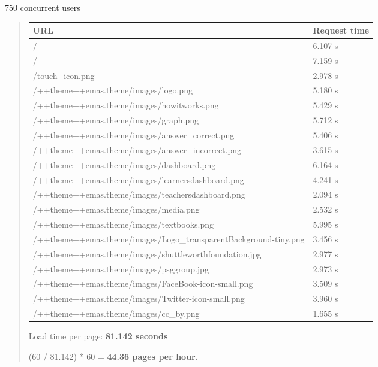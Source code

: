 \documentclass[letterpaper,10pt,english]{sphinxmanual}
\begin{document}
750 concurrent users
\begin{quote}

\begin{tabulary}{\linewidth}{|L|L|}
\hline
\textbf{\relax 
URL
} & \textbf{\relax 
Request time
}\\\hline

/
 & 
6.107 s
\\\hline

/
 & 
7.159 s
\\\hline

/touch\_icon.png
 & 
2.978 s
\\\hline

/++theme++emas.theme/images/logo.png
 & 
5.180 s
\\\hline

/++theme++emas.theme/images/howitworks.png
 & 
5.429 s
\\\hline

/++theme++emas.theme/images/graph.png
 & 
5.712 s
\\\hline

/++theme++emas.theme/images/answer\_correct.png
 & 
5.406 s
\\\hline

/++theme++emas.theme/images/answer\_incorrect.png
 & 
3.615 s
\\\hline

/++theme++emas.theme/images/dashboard.png
 & 
6.164 s
\\\hline

/++theme++emas.theme/images/learnersdashboard.png
 & 
4.241 s
\\\hline

/++theme++emas.theme/images/teachersdashboard.png
 & 
2.094 s
\\\hline

/++theme++emas.theme/images/media.png
 & 
2.532 s
\\\hline

/++theme++emas.theme/images/textbooks.png
 & 
5.995 s
\\\hline

/++theme++emas.theme/images/Logo\_transparentBackground-tiny.png
 & 
3.456 s
\\\hline

/++theme++emas.theme/images/shuttleworthfoundation.jpg
 & 
2.977 s
\\\hline

/++theme++emas.theme/images/psggroup.jpg
 & 
2.973 s
\\\hline

/++theme++emas.theme/images/FaceBook-icon-small.png
 & 
3.509 s
\\\hline

/++theme++emas.theme/images/Twitter-icon-small.png
 & 
3.960 s
\\\hline

/++theme++emas.theme/images/cc\_by.png
 & 
1.655 s
\\\hline
\end{tabulary}


Load time per page: \textbf{81.142 seconds}

(60 / 81.142) * 60 = \textbf{44.36 pages per hour.}
\end{quote}
\end{document}
